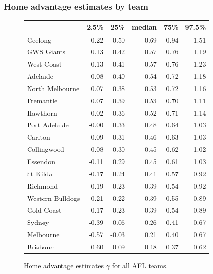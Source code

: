\documentclass{beamer}
\begin{document}
\begin{frame}
	\frametitle{Home advantage estimates by team}
	\begin{figure}
	\centering
	\tiny
	\begin{tabular}{lrrrrr}
\toprule
{} &  2.5\% &   25\% &  median &   75\% &  97.5\% \\
\midrule
Geelong          &  0.22 &  0.50 &    0.69 &  0.94 &   1.51 \\
GWS Giants       &  0.13 &  0.42 &    0.57 &  0.76 &   1.19 \\
West Coast       &  0.13 &  0.41 &    0.57 &  0.76 &   1.23 \\
Adelaide         &  0.08 &  0.40 &    0.54 &  0.72 &   1.18 \\
North Melbourne  &  0.07 &  0.38 &    0.53 &  0.72 &   1.16 \\
Fremantle        &  0.07 &  0.39 &    0.53 &  0.70 &   1.11 \\
Hawthorn         &  0.02 &  0.36 &    0.52 &  0.71 &   1.14 \\
Port Adelaide    & -0.00 &  0.33 &    0.48 &  0.64 &   1.03 \\
Carlton          & -0.09 &  0.31 &    0.46 &  0.63 &   1.03 \\
Collingwood      & -0.08 &  0.30 &    0.45 &  0.62 &   1.02 \\
Essendon         & -0.11 &  0.29 &    0.45 &  0.61 &   1.03 \\
St Kilda         & -0.17 &  0.24 &    0.41 &  0.57 &   0.92 \\
Richmond         & -0.19 &  0.23 &    0.39 &  0.54 &   0.92 \\
Western Bulldogs & -0.21 &  0.22 &    0.39 &  0.55 &   0.89 \\
Gold Coast       & -0.17 &  0.23 &    0.39 &  0.54 &   0.89 \\
Sydney           & -0.39 &  0.06 &    0.26 &  0.41 &   0.67 \\
Melbourne        & -0.57 & -0.03 &    0.21 &  0.40 &   0.67 \\
Brisbane         & -0.60 & -0.09 &    0.18 &  0.37 &   0.62 \\
\bottomrule
\end{tabular}
\caption{Home advantage estimates $\gamma$ for all AFL teams.}
\end{figure}
\end{frame}
\end{document}
